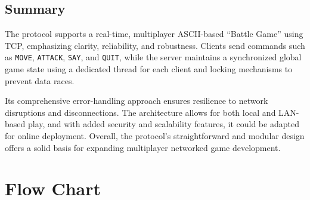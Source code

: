 \documentclass{article}
\begin{document}
\subsection{Summary}

The protocol supports a real-time, multiplayer ASCII-based ``Battle Game'' using TCP, emphasizing clarity, reliability, and robustness. Clients send commands such as \texttt{MOVE}, \texttt{ATTACK}, \texttt{SAY}, and \texttt{QUIT}, while the server maintains a synchronized global game state using a dedicated thread for each client and locking mechanisms to prevent data races.

Its comprehensive error-handling approach ensures resilience to network disruptions and disconnections. The architecture allows for both local and LAN-based play, and with added security and scalability features, it could be adapted for online deployment. Overall, the protocol's straightforward and modular design offers a solid basis for expanding multiplayer networked game development.

\section{Flow Chart}


\end{document}
